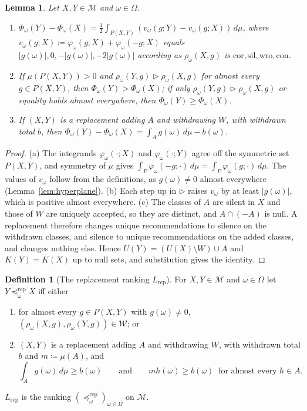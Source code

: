 \documentclass[11pt]{article}
\newcommand{\chgb}[1]{{\color{violet}#1}}
\newtheorem{lemma}[theorem]{Lemma}
\theoremstyle{definition}
\newtheorem{definition}[theorem]{Definition}
\theoremstyle{remark}
\newcommand{\M}{\mathcal M}
\newcommand{\cor}{\mathrm{cor}}
\newcommand{\sil}{\mathrm{sil}}
\newcommand{\wro}{\mathrm{wro}}
\newcommand{\con}{\mathrm{con}}
\newcommand{\Lrep}{L_{\mathrm{rep}}}
\newcommand{\prep}{\preceq^{\mathrm{rep}}}
\begin{document}
\begin{lemma}\label{lem:Phi}
Let $X,Y\in\M$ and $\omega\in\Omega$.
\begin{enumerate}[label=(\alph*)]
\item $\Phi_\omega(Y)-\Phi_\omega(X)=\frac12\int_{P(X,Y)}(v_\omega(g;Y)-v_\omega(g;X))\,d\mu$, where $v_\omega(g;X)\coloneqq\varphi_\omega(g;X)+\varphi_\omega(-g;X)$ equals $|g(\omega)|,0,-|g(\omega)|,-2|g(\omega)|$ according as $\rho_\omega(X,g)$ is $\cor,\sil,\wro,\con$.
\item If $\mu(P(X,Y))>0$ and $\rho_\omega(Y,g)\rhd\rho_\omega(X,g)$ for almost every $g\in P(X,Y)$, then $\Phi_\omega(Y)>\Phi_\omega(X)$; if only $\rho_\omega(Y,g)\rhd\rho_\omega(X,g)$ or equality holds almost everywhere, then $\Phi_\omega(Y)\ge\Phi_\omega(X)$.
\item If $(X,Y)$ is a replacement adding $A$ and withdrawing $W$, with withdrawn total $b$, then $\Phi_\omega(Y)-\Phi_\omega(X)=\int_Ag(\omega)\,d\mu-b(\omega)$.
\end{enumerate}
\end{lemma}
\begin{proof}
(a) The integrands $\varphi_\omega(\cdot;X)$ and $\varphi_\omega(\cdot;Y)$ agree off the symmetric set $P(X,Y)$, and symmetry of $\mu$ gives $\int_P\varphi_\omega(-g;\cdot)\,d\mu=\int_P\varphi_\omega(g;\cdot)\,d\mu$. The values of $v_\omega$ follow from the definitions, as $g(\omega)\ne0$ almost everywhere (Lemma~\ref{lem:hyperplane}). (b) Each step up in $\rhd$ raises $v_\omega$ by at least $|g(\omega)|$, which is positive almost everywhere. (c) \chgb{The classes of $A$ are silent in $X$ and those of $W$ are uniquely accepted, so they are distinct, and $A\cap(-A)$ is null. A replacement therefore changes unique recommendations to silence on the withdrawn classes, and silence to unique recommendations on the added classes, and changes nothing else. Hence $U(Y)=(U(X)\setminus W)\cup A$ and $K(Y)=K(X)$ up to null sets, and substitution gives the identity.}
\end{proof}

\begin{definition}[The replacement ranking $\Lrep$]\label{def:Lrep}
For $X,Y\in\M$ and $\omega\in\Omega$ let $Y\prep_\omega X$ iff either
\begin{enumerate}[label=(L\alph*)]
\item\label{La} for almost every $g\in P(X,Y)$ with $g(\omega)\ne0$, $(\rho_\omega(X,g),\rho_\omega(Y,g))\in\mathcal W$; or
\item\label{Lb} $(X,Y)$ is a replacement adding $A$ and withdrawing $W$, with withdrawn total $b$ and $m\coloneqq\mu(A)$, and
\[
\int_Ag(\omega)\,d\mu\ge b(\omega)\qquad\text{and}\qquad mh(\omega)\ge b(\omega)\ \text{ for almost every }h\in A .
\]
\end{enumerate}
$\Lrep$ is the ranking $(\prep_\omega)_{\omega\in\Omega}$ on $\M$.
\end{definition}
\end{document}
